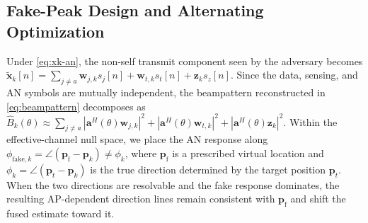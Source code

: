 \documentclass[letterpaper,journal]{IEEEtran}
\begin{document}


\subsection{Fake-Peak Design and Alternating Optimization}
\label{subsec:fake}
Under \eqref{eq:xk-an}, the non-self transmit component seen by the adversary becomes $\widetilde{\mathbf{x}}_k[n]=\sum_{j\neq a}\mathbf{w}_{j,k}s_j[n]+\mathbf{w}_{t,k}s_t[n]+\mathbf{z}_ks_z[n]$. Since the data, sensing, and AN symbols are mutually independent, the beampattern reconstructed in \eqref{eq:beampattern} decomposes as $\widehat{B}_k(\theta)\approx\sum_{j\neq a}|\mathbf{a}^H(\theta)\mathbf{w}_{j,k}|^2+|\mathbf{a}^H(\theta)\mathbf{w}_{t,k}|^2+|\mathbf{a}^H(\theta)\mathbf{z}_k|^2$. Within the effective-channel null space, we place the AN response along $\phi_{\mathrm{fake},k}=\angle(\mathbf{p}_{\mathrm{f}}-\mathbf{p}_k)\neq\phi_k$, where $\mathbf{p}_{\mathrm{f}}$ is a prescribed virtual location and $\phi_k=\angle(\mathbf{p}_t-\mathbf{p}_k)$ is the true direction determined by the target position $\mathbf{p}_t$. When the two directions are resolvable and the fake response dominates, the resulting AP-dependent direction lines remain consistent with $\mathbf{p}_{\mathrm{f}}$ and shift the fused estimate toward it.
\end{document}
